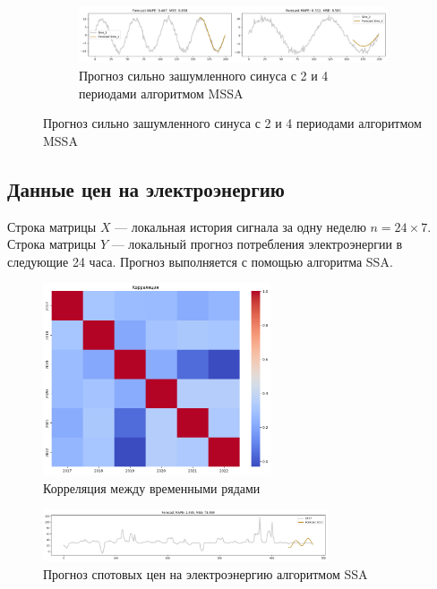 \documentclass{article}
\begin{document}
\begin{figure}[H]
    \vspace{\baselineskip}

    \begin{subfigure}
	\centering
	\includegraphics[width=1\textwidth]{figures/mssa_2sin_high_noise.png}
	\caption{Прогноз сильно зашумленного синуса с 2 и 4 периодами алгоритмом MSSA}
	\label{fig:fig2}
    \end{subfigure}
\end{figure}

\subsection{Данные цен на электроэнергию}

Строка матрицы $X$ –– локальная история сигнала за одну неделю $n = 24 \times 7$. Строка матрицы
$Y$ — локальный прогноз потребления электроэнергии в следующие 24 часа. Прогноз выполняется с помощью алгоритма SSA.

\begin{figure}[H]
	\centering
	\includegraphics[width=0.6\textwidth]{figures/correlation_elspots.png}
	\caption{Корреляция между временными рядами}
	\label{fig:fig3}
\end{figure}

\begin{figure}[H]
	\centering
	\includegraphics[width=0.75\textwidth]{figures/ssa_elspot_2017_plot.png}
	\caption{Прогноз спотовых цен на электроэнергию алгоритмом SSA}
	\label{fig:fig3}
\end{figure}
\end{document}
